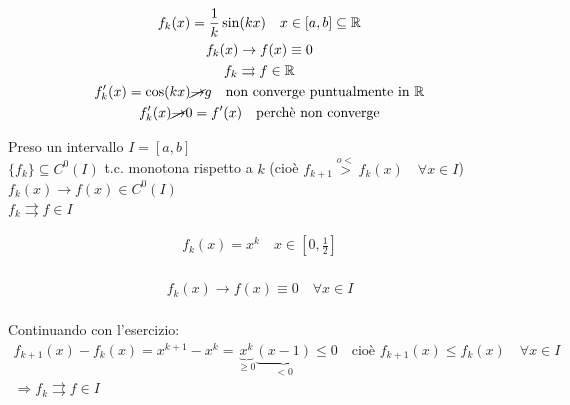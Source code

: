 \documentclass[a4paper, oneside]{article}
\begin{document}
\begin{example}
  \begin{gather*}
    f_k(x) = \frac{1}{k} \sin (kx) \quad x \in [a,b] \subseteq \mathbb{R}\\
    f_k(x) \to f(x) \equiv 0\\
    f_k \rightrightarrows f \in \mathbb{R}\\
    f'_k(x) = \cos(kx) \cancel{\to} g \quad \text{non converge puntualmente in } \mathbb{R}\\
    f'_k (x) \cancel{\to} 0 = f'(x) \quad \text{perchè non converge}
  \end{gather*}
\end{example}

\begin{theorem}
  Preso un intervallo $I = [a,b]$\\
   $\{f_k\} \subseteq C^0 (I)$ t.c. monotona rispetto a $k$ (cioè $f_{k+1} \overset{o <}{>} f_k(x) \quad \forall x \in I$)\\
   $f_k(x) \to f(x) \in C^0 (I)$\\
   $f_k \rightrightarrows f \in I$
\end{theorem}

\begin{example}
  \begin{gather*}
    f_k (x) = x^k \quad x \in [0,\frac{1}{2}]\\
  \end{gather*}

  \begin{observation}
    \begin{gather*}
      f_k(x) \to f(x) \equiv 0 \quad \forall x \in I\\
    \end{gather*}
  \end{observation}
  Continuando con l'esercizio:
  \begin{gather*}
    f_{k+1}(x) - f_k(x) = x^{k+1} - x^k = \underbrace{x^k}_{\geq 0} \underbrace{(x-1)}_{< 0} \leq 0 \quad \text{cioè } f_{k+1}(x) \leq f_k(x) \quad \forall x \in I\\
    \Rightarrow f_k \rightrightarrows f \in I
  \end{gather*}
\end{example}
\end{document}

